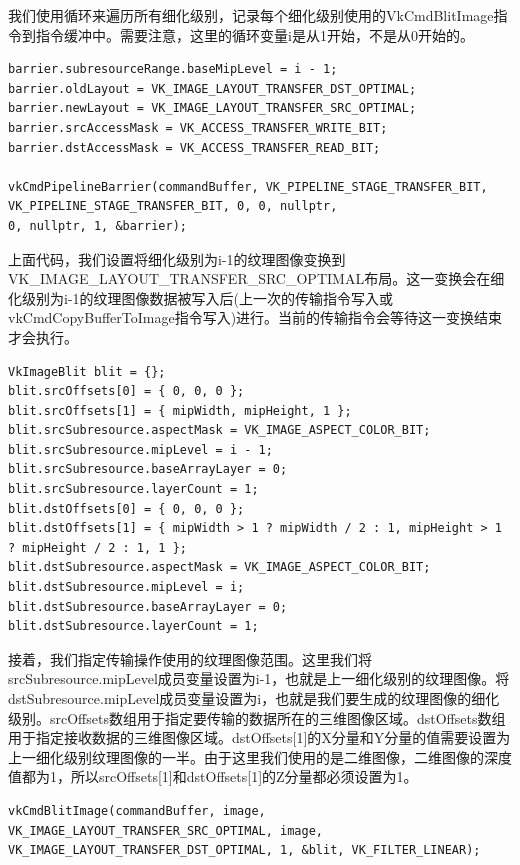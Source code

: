 \documentclass{ctexart}
\begin{document}
我们使用循环来遍历所有细化级别，记录每个细化级别使用的VkCmdBlitImage指令到指令缓冲中。需要注意，这里的循环变量i是从1开始，不是从0开始的。

\begin{lstlisting}[language={[ANSI]C}]
barrier.subresourceRange.baseMipLevel = i - 1;
barrier.oldLayout = VK_IMAGE_LAYOUT_TRANSFER_DST_OPTIMAL;
barrier.newLayout = VK_IMAGE_LAYOUT_TRANSFER_SRC_OPTIMAL;
barrier.srcAccessMask = VK_ACCESS_TRANSFER_WRITE_BIT;
barrier.dstAccessMask = VK_ACCESS_TRANSFER_READ_BIT;

vkCmdPipelineBarrier(commandBuffer, VK_PIPELINE_STAGE_TRANSFER_BIT, VK_PIPELINE_STAGE_TRANSFER_BIT, 0, 0, nullptr,
0, nullptr, 1, &barrier);
\end{lstlisting}

上面代码，我们设置将细化级别为i-1的纹理图像变换到VK\_IMAGE\_LAYOUT\_TRANSFER\_SRC\_OPTIMAL布局。这一变换会在细化级别为i-1的纹理图像数据被写入后(上一次的传输指令写入或vkCmdCopyBufferToImage指令写入)进行。当前的传输指令会等待这一变换结束才会执行。

\begin{lstlisting}[language={[ANSI]C}]
VkImageBlit blit = {};
blit.srcOffsets[0] = { 0, 0, 0 };
blit.srcOffsets[1] = { mipWidth, mipHeight, 1 };
blit.srcSubresource.aspectMask = VK_IMAGE_ASPECT_COLOR_BIT;
blit.srcSubresource.mipLevel = i - 1;
blit.srcSubresource.baseArrayLayer = 0;
blit.srcSubresource.layerCount = 1;
blit.dstOffsets[0] = { 0, 0, 0 };
blit.dstOffsets[1] = { mipWidth > 1 ? mipWidth / 2 : 1, mipHeight > 1 ? mipHeight / 2 : 1, 1 };
blit.dstSubresource.aspectMask = VK_IMAGE_ASPECT_COLOR_BIT;
blit.dstSubresource.mipLevel = i;
blit.dstSubresource.baseArrayLayer = 0;
blit.dstSubresource.layerCount = 1;
\end{lstlisting}

接着，我们指定传输操作使用的纹理图像范围。这里我们将srcSubresource.mipLevel成员变量设置为i-1，也就是上一细化级别的纹理图像。将dstSubresource.mipLevel成员变量设置为i，也就是我们要生成的纹理图像的细化级别。srcOffsets数组用于指定要传输的数据所在的三维图像区域。dstOffsets数组用于指定接收数据的三维图像区域。dstOffsets[1]的X分量和Y分量的值需要设置为上一细化级别纹理图像的一半。由于这里我们使用的是二维图像，二维图像的深度值都为1，所以srcOffsets[1]和dstOffsets[1]的Z分量都必须设置为1。

\begin{lstlisting}[language={[ANSI]C}]
vkCmdBlitImage(commandBuffer, image, VK_IMAGE_LAYOUT_TRANSFER_SRC_OPTIMAL, image, VK_IMAGE_LAYOUT_TRANSFER_DST_OPTIMAL, 1, &blit, VK_FILTER_LINEAR);
\end{lstlisting}
\end{document}

